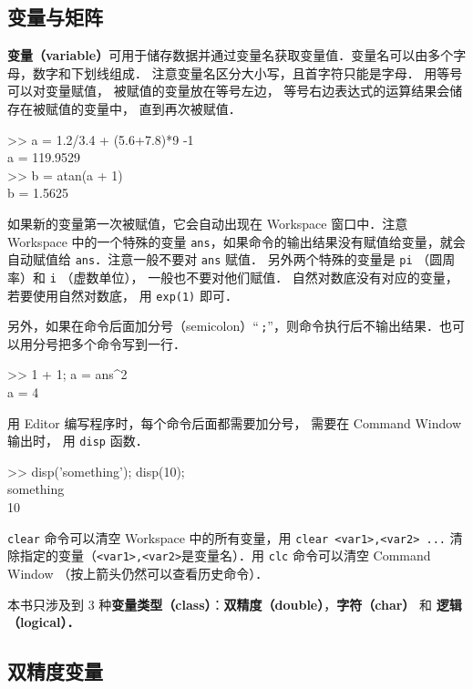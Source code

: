 

\subsection{变量与矩阵}
\textbf{变量（variable）}可用于储存数据并通过变量名获取变量值．变量名可以由多个字母，数字和下划线组成． 注意变量名区分大小写，且首字符只能是字母． 用等号可以对变量赋值， 被赋值的变量放在等号左边， 等号右边表达式的运算结果会储存在被赋值的变量中， 直到再次被赋值．
\begin{Command}
>> a = 1.2/3.4 + (5.6+7.8)*9 -1 \\
a = 119.9529 \\
>> b = atan(a + 1) \\
b = 1.5625
\end{Command}
如果新的变量第一次被赋值，它会自动出现在 Workspace 窗口中．注意 Workspace 中的一个特殊的变量 \texttt{ans}，如果命令的输出结果没有赋值给变量，就会自动赋值给 \texttt{ans}．注意一般不要对 \texttt{ans} 赋值． 另外两个特殊的变量是 \texttt{pi} （圆周率）和 \texttt{i} （虚数单位）， 一般也不要对他们赋值． 自然对数底没有对应的变量， 若要使用自然对数底， 用 \texttt{exp(1)} 即可．

另外，如果在命令后面加分号（semicolon）“\,\texttt{;}”，则命令执行后不输出结果．也可以用分号把多个命令写到一行．
\begin{Command}
>> 1 + 1; a = ans\^{}2 \\
a = 4
\end{Command}
用 Editor 编写程序时，每个命令后面都需要加分号， 需要在 Command Window 输出时， 用 \texttt{disp} 函数．
\begin{Command}
>> disp({\color{string}'something'}); disp(10);\\
something\\
10
\end{Command}

\texttt{clear} 命令可以清空 Workspace 中的所有变量，用 \texttt{clear <var1>,<var2> ...} 清除指定的变量（\texttt{<var1>,<var2>}是变量名）．用 \texttt{clc} 命令可以清空 Command Window （按上箭头仍然可以查看历史命令）．

本书只涉及到 3 种\textbf{变量类型（class）}：\textbf{双精度（double）}，\textbf{字符（char）} 和 \textbf{逻辑（logical）．}

\subsection{双精度变量}

